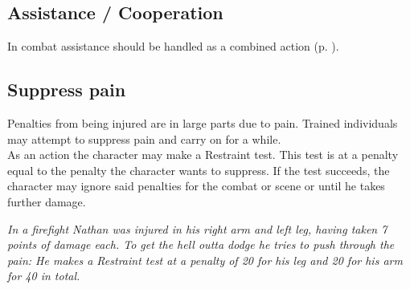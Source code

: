 \subsection*{Assistance / Cooperation}
In combat assistance should be handled as a combined action (p. \pageref{combinedaction}).
\subsection*{Suppress pain}
Penalties from being injured are in large parts due to pain. Trained individuals may attempt to suppress pain and carry on for a while.\\
As an action the character may make a Restraint test. This test is at a penalty equal to the penalty the character wants to suppress. If the test succeeds, the character may ignore said penalties for the combat or scene or until he takes further damage.
\begin{exampleblock}
	\itshape
	In a firefight Nathan was injured in his right arm and left leg, having taken 7 points of damage each. To get the hell outta dodge he tries to push through the pain: He makes a \emph{Restraint} test at a penalty of 20 for his leg and 20 for his arm for 40 in total.
\end{exampleblock}